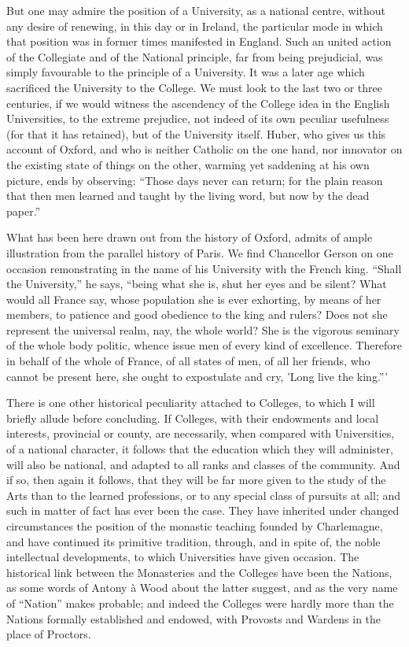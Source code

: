 But one may admire the
position of a University, as a national centre, without any desire of
renewing, in this day or in Ireland, the particular mode in which that
position was in former times manifested in England. Such an united
action of the Collegiate and of the National principle, far from being
prejudicial, was simply favourable to the principle of a University.
It was a later age which sacrificed the University to the College. We
must look to the last two or three centuries, if we would witness the
ascendency of the College idea in the English Universities, to the
extreme prejudice, not indeed of its own peculiar usefulness (for that
it has retained), but of the University itself. Huber, who gives us
this account of Oxford, and who is neither Catholic on the one
hand, nor innovator on the existing state of things on the other,
warming yet saddening at his own picture, ends by observing: ``Those
days never can return; for the plain reason that then men learned and
taught by the living word, but now by the dead paper.''

What has been here drawn out
from the history of Oxford, admits of ample illustration from the
parallel history of Paris. We find Chancellor Gerson on one occasion
remonstrating in the name of his University with the French king. ``Shall the University,'' he says,
``being what she is, shut her
eyes and be silent? What would all France say, whose population she is
ever exhorting, by means of her members, to patience and good
obedience to the king and rulers? Does not she represent the universal
realm, nay, the whole world? She is the vigorous seminary of the whole
body politic, whence issue men of every kind of excellence. Therefore
in behalf of the whole of France, of all states of men, of all her
friends, who cannot be present here, she ought to expostulate and cry,
'Long live the king.'''

There is one other historical
peculiarity attached to Colleges, to which I will briefly allude
before concluding. If Colleges, with their endowments and local
interests, provincial or county, are necessarily, when compared with
Universities, of a national character, it follows that the education
which they will administer, will also be national, and adapted to all
ranks and classes of the community. And if so, then again it follows,
that they will be far more given to the study of the Arts than to the
learned professions, or to any special class of pursuits at all; and
such in matter of fact has ever been the case. They have inherited
under changed circumstances the position of the monastic teaching
founded by Charlemagne, and have continued its primitive
tradition, through, and in spite of, the noble intellectual
developments, to which Universities have given occasion. The
historical link between the Monasteries and the Colleges have been the
Nations, as some words of Antony à Wood about the latter suggest, and
as the very name of ``Nation'' makes probable; and indeed the
Colleges were hardly more than the Nations formally established and
endowed, with Provosts and Wardens in the place of Proctors.

